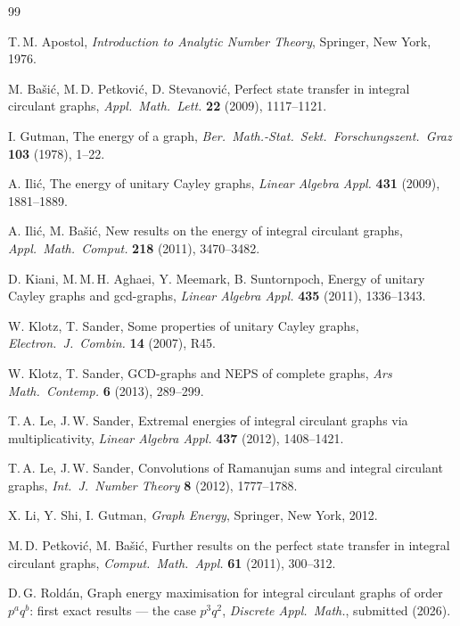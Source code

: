 \documentclass[12pt,a4paper]{article}
\theoremstyle{plain}
\theoremstyle{definition}
\begin{document}
\begin{thebibliography}{99}

T.\,M. Apostol,
\emph{Introduction to Analytic Number Theory},
Springer, New York, 1976.

M. Ba\v{s}i\'c, M.\,D. Petkovi\'c, D. Stevanovi\'c,
Perfect state transfer in integral circulant graphs,
\emph{Appl.\ Math.\ Lett.} \textbf{22} (2009), 1117--1121.

I. Gutman,
The energy of a graph,
\emph{Ber.\ Math.-Stat.\ Sekt.\ Forschungszent.\ Graz} \textbf{103}
(1978), 1--22.

A. Ili\'c,
The energy of unitary Cayley graphs,
\emph{Linear Algebra Appl.} \textbf{431} (2009), 1881--1889.

A. Ili\'c, M. Ba\v{s}i\'c,
New results on the energy of integral circulant graphs,
\emph{Appl.\ Math.\ Comput.} \textbf{218} (2011), 3470--3482.

D. Kiani, M.\,M.\,H. Aghaei, Y. Meemark, B. Suntornpoch,
Energy of unitary Cayley graphs and gcd-graphs,
\emph{Linear Algebra Appl.} \textbf{435} (2011), 1336--1343.

W. Klotz, T. Sander,
Some properties of unitary Cayley graphs,
\emph{Electron.\ J.\ Combin.} \textbf{14} (2007), R45.

W. Klotz, T. Sander,
GCD-graphs and NEPS of complete graphs,
\emph{Ars Math.\ Contemp.} \textbf{6} (2013), 289--299.

T.\,A. Le, J.\,W. Sander,
Extremal energies of integral circulant graphs via multiplicativity,
\emph{Linear Algebra Appl.} \textbf{437} (2012), 1408--1421.

T.\,A. Le, J.\,W. Sander,
Convolutions of Ramanujan sums and integral circulant graphs,
\emph{Int.\ J.\ Number Theory} \textbf{8} (2012), 1777--1788.

X. Li, Y. Shi, I. Gutman,
\emph{Graph Energy},
Springer, New York, 2012.

M.\,D. Petkovi\'c, M. Ba\v{s}i\'c,
Further results on the perfect state transfer in integral circulant graphs,
\emph{Comput.\ Math.\ Appl.} \textbf{61} (2011), 300--312.

D.\,G. Rold\'an,
Graph energy maximisation for integral circulant graphs of order $p^aq^b$:
first exact results --- the case $p^3q^2$,
\emph{Discrete Appl.\ Math.}, submitted (2026).


\end{thebibliography}
\end{document}
